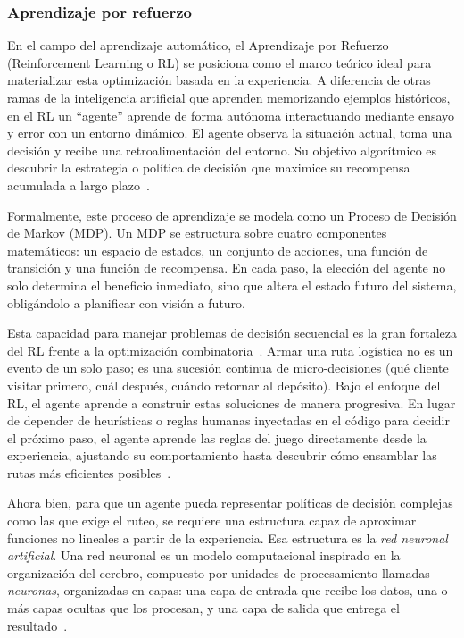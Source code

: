 \subsubsection{Aprendizaje por refuerzo} \label{sec:Aprendizajeporrefuerzo}
En el campo del aprendizaje automático, el Aprendizaje por Refuerzo (Reinforcement Learning o RL) se posiciona como el marco teórico ideal para materializar esta optimización basada en la experiencia. A diferencia de otras ramas de la inteligencia artificial que aprenden memorizando ejemplos históricos, en el RL un \enquote{agente} aprende de forma autónoma interactuando mediante ensayo y error con un entorno dinámico. El agente observa la situación actual, toma una decisión y recibe una retroalimentación del entorno. Su objetivo algorítmico es descubrir la estrategia o política de decisión que maximice su recompensa acumulada a largo plazo~\cite{SuttonBarto2014}.

Formalmente, este proceso de aprendizaje se modela como un Proceso de Decisión de Markov (MDP). Un MDP se estructura sobre cuatro componentes matemáticos: un espacio de estados, un conjunto de acciones, una función de transición y una función de recompensa. En cada paso, la elección del agente no solo determina el beneficio inmediato, sino que altera el estado futuro del sistema, obligándolo a planificar con visión a futuro.

Esta capacidad para manejar problemas de decisión secuencial es la gran fortaleza del RL frente a la optimización combinatoria~\cite{bengio2020machinelearningcombinatorialoptimization}. Armar una ruta logística no es un evento de un solo paso; es una sucesión continua de micro-decisiones (qué cliente visitar primero, cuál después, cuándo retornar al depósito). Bajo el enfoque del RL, el agente aprende a construir estas soluciones de manera progresiva. En lugar de depender de heurísticas o reglas humanas inyectadas en el código para decidir el próximo paso, el agente aprende las reglas del juego directamente desde la experiencia, ajustando su comportamiento hasta descubrir cómo ensamblar las rutas más eficientes posibles~\cite{bengio2020machinelearningcombinatorialoptimization, SuttonBarto2014}.


Ahora bien, para que un agente pueda representar políticas de decisión complejas como las que exige el ruteo, se requiere una estructura capaz de aproximar funciones no lineales a partir de la experiencia. Esa estructura es la \textit{red neuronal artificial}. Una red neuronal es un modelo computacional inspirado en la organización del cerebro, compuesto por unidades de procesamiento llamadas \textit{neuronas}, organizadas en capas: una capa de entrada que recibe los datos, una o más capas ocultas que los procesan, y una capa de salida que entrega el resultado~\cite{Goodfellow2016}.

